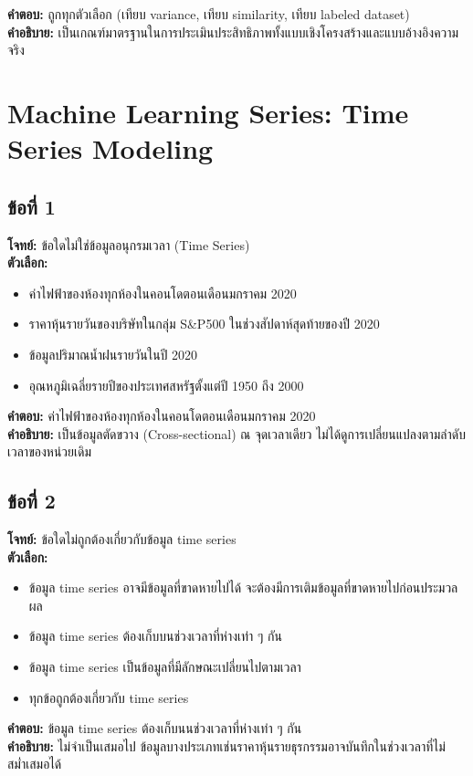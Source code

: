 \documentclass[12pt]{article}
\begin{document}
\textbf{คำตอบ:} ถูกทุกตัวเลือก (เทียบ variance, เทียบ similarity, เทียบ labeled dataset)\\
\textbf{คำอธิบาย:} เป็นเกณฑ์มาตรฐานในการประเมินประสิทธิภาพทั้งแบบเชิงโครงสร้างและแบบอ้างอิงความจริง

\newpage
\section{Machine Learning Series: Time Series Modeling}

\subsection*{ข้อที่ 1}
\textbf{โจทย์:} ข้อใดไม่ใช่ข้อมูลอนุกรมเวลา (Time Series)\\
\textbf{ตัวเลือก:}
\begin{itemize}
    \item ค่าไฟฟ้าของห้องทุกห้องในคอนโดตอนเดือนมกราคม 2020
    \item ราคาหุ้นรายวันของบริษัทในกลุ่ม S\&P500 ในช่วงสัปดาห์สุดท้ายของปี 2020
    \item ข้อมูลปริมาณน้ำฝนรายวันในปี 2020
    \item อุณหภูมิเฉลี่ยรายปีของประเทศสหรัฐตั้งแต่ปี 1950 ถึง 2000
\end{itemize}

\textbf{คำตอบ:} ค่าไฟฟ้าของห้องทุกห้องในคอนโดตอนเดือนมกราคม 2020\\
\textbf{คำอธิบาย:} เป็นข้อมูลตัดขวาง (Cross-sectional) ณ จุดเวลาเดียว ไม่ได้ดูการเปลี่ยนแปลงตามลำดับเวลาของหน่วยเดิม

\subsection*{ข้อที่ 2}
\textbf{โจทย์:} ข้อใดไม่ถูกต้องเกี่ยวกับข้อมูล time series\\
\textbf{ตัวเลือก:}
\begin{itemize}
    \item ข้อมูล time series อาจมีข้อมูลที่ขาดหายไปได้ จะต้องมีการเติมข้อมูลที่ขาดหายไปก่อนประมวลผล
    \item ข้อมูล time series ต้องเก็บบนช่วงเวลาที่ห่างเท่า ๆ กัน
    \item ข้อมูล time series เป็นข้อมูลที่มีลักษณะเปลี่ยนไปตามเวลา
    \item ทุกข้อถูกต้องเกี่ยวกับ time series
\end{itemize}

\textbf{คำตอบ:} ข้อมูล time series ต้องเก็บนนช่วงเวลาที่ห่างเท่า ๆ กัน\\
\textbf{คำอธิบาย:} ไม่จำเป็นเสมอไป ข้อมูลบางประเภทเช่นราคาหุ้นรายธุรกรรมอาจบันทึกในช่วงเวลาที่ไม่สม่ำเสมอได้
\end{document}
